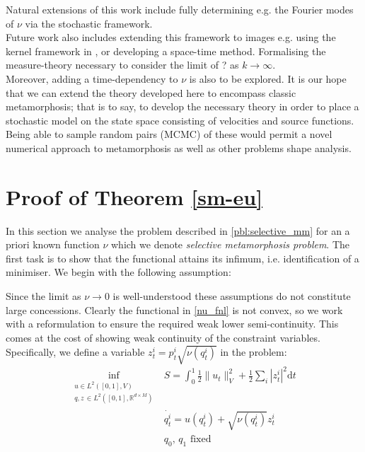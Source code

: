 \documentclass[runningheads]{llncs}
\newcommand{\half}{\frac 12}
\newcommand{\norm}[2]{\| #1 \|_{ #2 }}
\newcommand{\vnorm}[1]{\norm{ #1 }{V}}
\newcommand{\diff}[1]{\text{d} #1}
\newcommand{\RdM}{\mathbb{R}^{d\times M}}
\begin{document}
Natural extensions of this work include fully determining e.g. the Fourier modes
of $\nu$ via the stochastic framework.\\

Future work also includes extending this framework to images e.g. using the
kernel framework in \cite{richardson2016metamorphosis}, or developing a
space-time method. Formalising the measure-theory necessary to consider the
limit of ? as $k\rightarrow\infty$.\\

Moreover, adding a time-dependency to $\nu$ is also to be explored. It is our
hope that we can extend the theory developed here to encompass classic
metamorphosis; that is to say, to develop the necessary theory in order to place
a stochastic model on the state space consisting of velocities and source
functions. Being able to sample random pairs (MCMC) of these would permit a
novel numerical approach to metamorphosis as well as other problems shape
analysis.

\appendix

\section{Proof of Theorem \ref{sm-eu}}\label{app:proof:sm-eu}
In this section we analyse the problem described in \eqref{pbl:selective_mm} for
an a priori known function $\nu$ which we denote \emph{selective metamorphosis
problem}. The first task is to show that the functional attains its infimum,
i.e. identification of a minimiser. We begin with the following assumption:


Since the limit as $\nu\rightarrow 0$ is well-understood these assumptions do
not constitute large concessions. Clearly the functional in \eqref{nu_fnl} is
not convex, so we work with a reformulation to ensure the required weak lower
semi-continuity. This comes at the cost of showing weak continuity of the
constraint variables. Specifically, we define a variable $z^i_t = p^i_t
\sqrt{\nu(q_t^i)}$ in the problem:
\begin{align}
\inf_{\substack{u \in L^2([0,1],V)\\ q, z\, \in L^2([0,1],\RdM)}}
    & S = \int_0^1 \half\vnorm{u_t}^2 + \half\sum_i |z_t^i|^2 \diff{t}\\
    & \dot{q_t^i} = u(q_t^i) + \sqrt{\nu(q_t^i)} z^i_t\\
    & q_0,\,q_1\text{ fixed}
  \label{pbl:reformulation}
\end{align}
\end{document}
